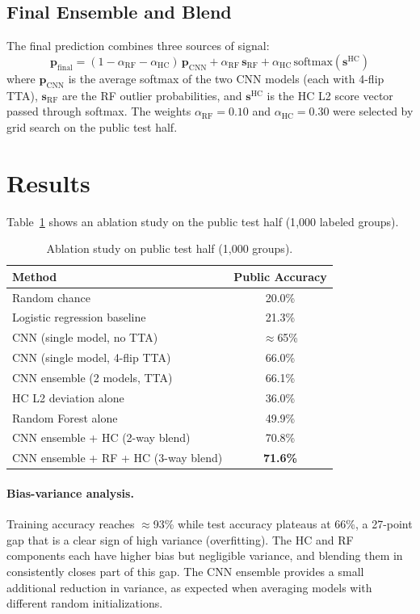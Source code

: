 \documentclass[11pt]{article}
\begin{document}
\subsection{Final Ensemble and Blend}

The final prediction combines three sources of signal:
\[
  \mathbf{p}_{\text{final}} = (1 - \alpha_{\text{RF}} - \alpha_{\text{HC}})\,\mathbf{p}_{\text{CNN}} + \alpha_{\text{RF}}\,\mathbf{s}_{\text{RF}} + \alpha_{\text{HC}}\,\text{softmax}(\mathbf{s}^{\text{HC}})
\]
where $\mathbf{p}_{\text{CNN}}$ is the average softmax of the two CNN models (each with 4-flip TTA),
$\mathbf{s}_{\text{RF}}$ are the RF outlier probabilities, and $\mathbf{s}^{\text{HC}}$ is the HC L2 score
vector passed through softmax. The weights $\alpha_{\text{RF}} = 0.10$ and $\alpha_{\text{HC}} = 0.30$
were selected by grid search on the public test half.

\section{Results}

Table~\ref{tab:ablation} shows an ablation study on the public test half (1{,}000 labeled groups).

\begin{table}[h]
\centering
\caption{Ablation study on public test half (1{,}000 groups).}
\label{tab:ablation}
\vspace{4pt}
\begin{tabular}{lc}
\toprule
Method & Public Accuracy \\
\midrule
Random chance & 20.0\% \\
Logistic regression baseline & 21.3\% \\
CNN (single model, no TTA) & $\approx$65\% \\
CNN (single model, 4-flip TTA) & 66.0\% \\
CNN ensemble (2 models, TTA) & 66.1\% \\
HC L2 deviation alone & 36.0\% \\
Random Forest alone & 49.9\% \\
CNN ensemble + HC (2-way blend) & 70.8\% \\
CNN ensemble + RF + HC (3-way blend) & \textbf{71.6\%} \\
\bottomrule
\end{tabular}
\end{table}

\paragraph{Bias-variance analysis.}
Training accuracy reaches $\approx$93\% while test accuracy plateaus at 66\%, a 27-point gap that is a
clear sign of high variance (overfitting). The HC and RF components each have higher bias but
negligible variance, and blending them in consistently closes part of this gap. The CNN ensemble
provides a small additional reduction in variance, as expected when averaging models with different
random initializations.
\end{document}
